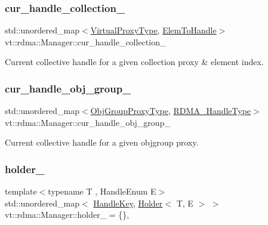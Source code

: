 \subsubsection{\texorpdfstring{cur\+\_\+handle\+\_\+collection\+\_\+}{cur\_handle\_collection\_}}
{\footnotesize\ttfamily std\+::unordered\+\_\+map$<$\hyperlink{namespacevt_a1b417dd5d684f045bb58a0ede70045ac}{Virtual\+Proxy\+Type}, \hyperlink{structvt_1_1rdma_1_1_manager_ad794893058cec7595bc2bcb466ce7d3f}{Elem\+To\+Handle}$>$ vt\+::rdma\+::\+Manager\+::cur\+\_\+handle\+\_\+collection\+\_\+\hspace{0.3cm}{\ttfamily [private]}}



Current collective handle for a given collection proxy \& element index. 

\mbox{\label{structvt_1_1rdma_1_1_manager_a1aa2e20b7843cdc8efeddda319195113}} 
\subsubsection{\texorpdfstring{cur\+\_\+handle\+\_\+obj\+\_\+group\+\_\+}{cur\_handle\_obj\_group\_}}
{\footnotesize\ttfamily std\+::unordered\+\_\+map$<$\hyperlink{namespacevt_ad7cae989df485fccca57f0792a880a8e}{Obj\+Group\+Proxy\+Type}, \hyperlink{namespacevt_a10442579ec4e7ebef223818e64bcf908}{R\+D\+M\+A\+\_\+\+Handle\+Type}$>$ vt\+::rdma\+::\+Manager\+::cur\+\_\+handle\+\_\+obj\+\_\+group\+\_\+\hspace{0.3cm}{\ttfamily [private]}}



Current collective handle for a given objgroup proxy. 

\mbox{\label{structvt_1_1rdma_1_1_manager_ab5b5ed6b205fba6f378ef22cdb3d4143}} 
\subsubsection{\texorpdfstring{holder\+\_\+}{holder\_}}
{\footnotesize\ttfamily template$<$typename T , Handle\+Enum E$>$ \\
std\+::unordered\+\_\+map$<$ \hyperlink{structvt_1_1rdma_1_1_handle_key}{Handle\+Key}, \hyperlink{structvt_1_1rdma_1_1_holder}{Holder}$<$ T, E $>$ $>$ vt\+::rdma\+::\+Manager\+::holder\+\_\+ = \{\}\hspace{0.3cm}{\ttfamily [static]}, {\ttfamily [private]}}



